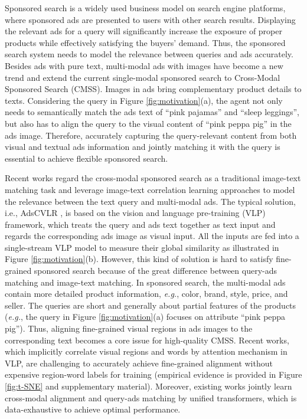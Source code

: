 \documentclass[letterpaper]{article} \usepackage{aaai24}  \usepackage{times}  \usepackage{helvet}  \usepackage{courier}  \usepackage[hyphens]{url}  \usepackage{graphicx} \urlstyle{rm} \def\UrlFont{\rm}  \usepackage{natbib}  \usepackage{caption} \frenchspacing  \setlength{\pdfpagewidth}{8.5in}  \setlength{\pdfpageheight}{11in}
\begin{document}
Sponsored search \cite{jansen2008sponsored, ling2017model, 10.1145/3503161.3548226} is a widely used business model on search engine platforms, where sponsored ads are presented to users with other search results. Displaying the relevant ads for a query will significantly increase the exposure of proper products while effectively satisfying the buyers' demand. Thus, the sponsored search system needs to model the relevance between queries and ads accurately.  Besides ads with pure text, multi-modal ads with images have become a new trend and extend the current single-modal sponsored search to Cross-Modal Sponsored Search (CMSS). Images in ads bring complementary product details to texts. Considering the query in Figure \ref{fig:motivation}(a), the agent not only needs to semantically match the ads text of ``pink pajamas'' and ``sleep leggings'', but also has to align the query to the visual content of ``pink peppa pig'' in the ads image. Therefore, accurately capturing the query-relevant content from both visual and textual ads information and jointly matching it with the query is essential to achieve flexible sponsored search.

Recent works \cite{10.1145/3503161.3548226} regard the cross-modal sponsored search as a traditional image-text matching task and leverage image-text correlation learning approaches to model the relevance between the text query and multi-modal ads. The typical solution, i.e., AdsCVLR \cite{10.1145/3503161.3548226}, is based on the vision and language pre-training (VLP) framework, which treats the query and ads text together as text input and regards the corresponding ads image as visual input. All the inputs are fed into a single-stream VLP model to measure their global similarity as illustrated in Figure \ref{fig:motivation}(b). However, this kind of solution is hard to satisfy fine-grained sponsored search because of the great difference between query-ads matching and image-text matching. In sponsored search, the multi-modal ads contain more detailed product information, \textit{e.g.}, color, brand, style, price, and seller. The queries are short \cite{10.1145/3503161.3548226} and generally about partial features of the products (\textit{e.g.}, the query in Figure \ref{fig:motivation}(a) focuses on  attribute ``pink peppa pig''). Thus, aligning fine-grained visual regions in ads images to the corresponding text becomes a core issue for high-quality CMSS. Recent works, which implicitly correlate visual regions and words by attention mechanism in VLP, are challenging to accurately achieve fine-grained alignment without expensive region-word labels for training (empirical evidence is provided in Figure \ref{fig:t-SNE} and supplementary material). 
Moreover, existing works jointly learn cross-modal alignment and query-ads matching by unified transformers, which is data-exhaustive to achieve optimal performance.  
\end{document}

